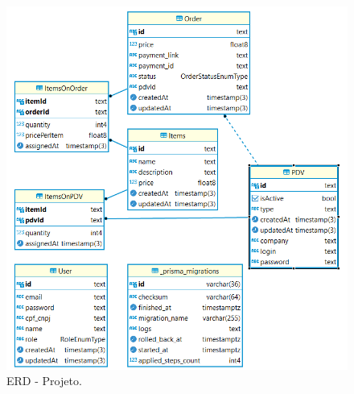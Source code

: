 \begin{figure}
	\caption{\label{fig:database}ERD - Projeto.}
	\begin{center}
		\includegraphics{figuras/database.png}
	\end{center}
\end{figure}


